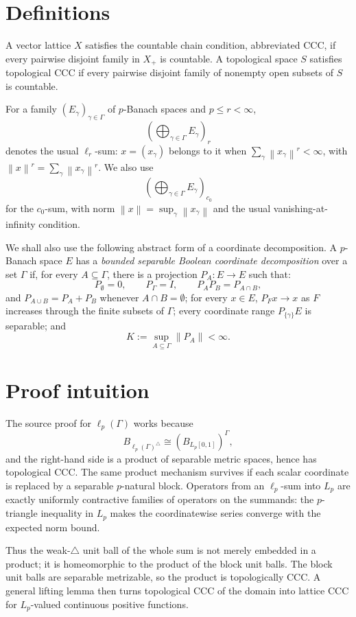 \documentclass[11pt]{article}
\newcommand{\Lp}{L_p[0,1]}
\newcommand{\norm}[1]{\left\lVert #1\right\rVert}
\begin{document}
\section*{Definitions}

A vector lattice \(X\) satisfies the countable chain condition, abbreviated
CCC, if every pairwise disjoint family in \(X_+\) is countable.  A topological
space \(S\) satisfies topological CCC if every pairwise disjoint family of
nonempty open subsets of \(S\) is countable.

For a family \((E_\gamma)_{\gamma\in\Gamma}\) of \(p\)-Banach spaces and
\(p\leq r<\infty\),
\[
  \left(\bigoplus_{\gamma\in\Gamma} E_\gamma\right)_r
\]
denotes the usual \(\ell_r\)-sum: \(x=(x_\gamma)\) belongs to it when
\(\sum_\gamma \norm{x_\gamma}^r<\infty\), with
\(\norm{x}^r=\sum_\gamma \norm{x_\gamma}^r\).  We also use
\[
  \left(\bigoplus_{\gamma\in\Gamma} E_\gamma\right)_{c_0}
\]
for the \(c_0\)-sum, with norm
\(\norm{x}=\sup_\gamma\norm{x_\gamma}\) and the usual vanishing-at-infinity
condition.

We shall also use the following abstract form of a coordinate decomposition.
A \(p\)-Banach space \(E\) has a \emph{bounded separable Boolean coordinate
decomposition} over a set \(\Gamma\) if, for every \(A\subseteq\Gamma\), there
is a projection \(P_A:E\to E\) such that:
\[
  P_\emptyset=0,\qquad P_\Gamma=I,\qquad
  P_AP_B=P_{A\cap B},
\]
and \(P_{A\cup B}=P_A+P_B\) whenever \(A\cap B=\emptyset\); for every
\(x\in E\), \(P_Fx\to x\) as \(F\) increases through the finite subsets of
\(\Gamma\); every coordinate range \(P_{\{\gamma\}}E\) is separable; and
\[
  K:=\sup_{A\subseteq\Gamma}\|P_A\|<\infty.
\]

\section*{Proof intuition}

The source proof for \(\ell_p(\Gamma)\) works because
\[
  B_{\ell_p(\Gamma)^\triangle}\cong (B_{\Lp})^\Gamma,
\]
and the right-hand side is a product of separable metric spaces, hence has
topological CCC.  The same product mechanism survives if each scalar
coordinate is replaced by a separable \(p\)-natural block.  Operators from an
\(\ell_p\)-sum into \(L_p\) are exactly uniformly contractive families of
operators on the summands: the \(p\)-triangle inequality in \(L_p\) makes the
coordinatewise series converge with the expected norm bound.

Thus the weak-\(\triangle\) unit ball of the whole sum is not merely embedded
in a product; it is homeomorphic to the product of the block unit balls.  The
block unit balls are separable metrizable, so the product is topologically
CCC.  A general lifting lemma then turns topological CCC of the domain into
lattice CCC for \(L_p\)-valued continuous positive functions.
\end{document}
